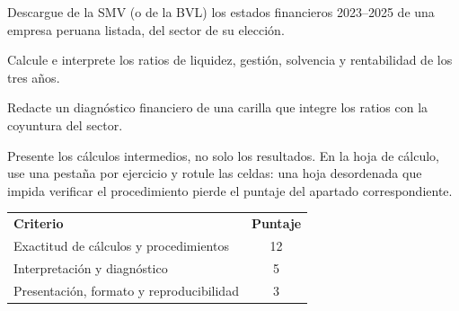 \documentclass{evaluacion}
\begin{document}
\begin{ejercicio}
Descargue de la SMV (o de la BVL) los estados financieros 2023--2025 de
una empresa peruana listada, del sector de su elección.
\begin{apartados}
  \item Calcule e interprete los ratios de liquidez, gestión, solvencia y
        rentabilidad de los tres años. 
  \item Redacte un diagnóstico financiero de una carilla que integre los
        ratios con la coyuntura del sector. 
\end{apartados}
\end{ejercicio}

\begin{observacion}[Recomendaciones]
Presente los cálculos intermedios, no solo los resultados. En la hoja de
cálculo, use una pestaña por ejercicio y rotule las celdas: una hoja
desordenada que impida verificar el procedimiento pierde el puntaje del
apartado correspondiente.
\end{observacion}

\begin{criterios}
\begin{tabularx}{\linewidth}{@{}X c@{}}
  \textbf{Criterio} & \textbf{Puntaje}\\
  \arrayrulecolor{grislinea}\hline\addlinespace[3pt]
  Exactitud de cálculos y procedimientos           & 12\\
  Interpretación y diagnóstico                     & 5\\
  Presentación, formato y reproducibilidad         & 3\\
\end{tabularx}
\end{criterios}

\findelexamen
\end{document}
